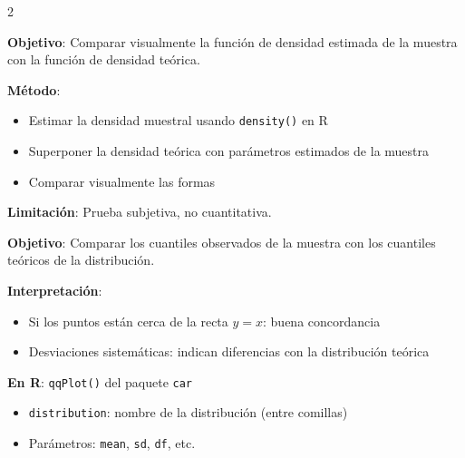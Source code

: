 \documentclass[10pt,a4paper]{article}
\begin{document}
\begin{multicols}{2}
    \begin{tcolorbox}[title=Histogramas y Densidad, equal height group=BA1]
        \textbf{Objetivo}: Comparar visualmente la función de densidad estimada de la muestra con la función de densidad teórica.
        
        \textbf{Método}:
        \begin{itemize}
            \item Estimar la densidad muestral usando \texttt{density()} en R
            \item Superponer la densidad teórica con parámetros estimados de la muestra
            \item Comparar visualmente las formas
        \end{itemize}
        
        \textbf{Limitación}: Prueba subjetiva, no cuantitativa.
    \end{tcolorbox}
    \begin{tcolorbox}[title=Q-Q Plots (Cuantil-Cuantil), equal height group=BA1]
        \textbf{Objetivo}: Comparar los cuantiles observados de la muestra con los cuantiles teóricos de la distribución.
        
        \textbf{Interpretación}:
        \begin{itemize}
            \item Si los puntos están cerca de la recta $y=x$: buena concordancia
            \item Desviaciones sistemáticas: indican diferencias con la distribución teórica
        \end{itemize}
        
        \textbf{En R}: \texttt{qqPlot()} del paquete \texttt{car}
        \begin{itemize}
            \item \texttt{distribution}: nombre de la distribución (entre comillas)
            \item Parámetros: \texttt{mean}, \texttt{sd}, \texttt{df}, etc.
        \end{itemize}
    \end{tcolorbox}
\end{multicols}

\end{document}
